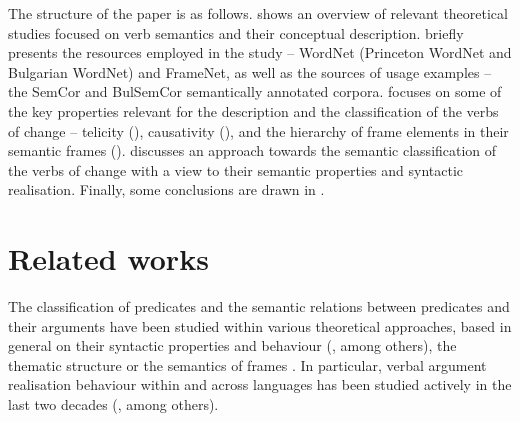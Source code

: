 \documentclass[output=paper,colorlinks,citecolor=brown]{langscibook}
\begin{document}
The structure of the paper is as follows.  shows an overview of relevant theoretical studies focused on verb semantics and their conceptual description.  briefly presents the resources employed in the study -- WordNet (Princeton WordNet and Bulgarian WordNet) and FrameNet, as well as the sources of usage examples -- the SemCor and BulSemCor semantically annotated corpora.  focuses on some of the key properties relevant for the description and the classification of the verbs of change -- telicity (), causativity (), and the hierarchy of frame elements in their semantic frames ().  discusses an approach towards the semantic classification of the verbs of change with a view to their semantic properties and syntactic realisation. Finally, some conclusions are drawn in .

\section{Related works}\label{sec:related}


The classification of predicates and the semantic relations between predicates and their arguments have been studied within various theoretical approaches, based in general on their syntactic properties and behaviour (\cite{Levin1993,Pinker1989}, among others), the thematic structure \citep{VanValinLaPolla1997} or the semantics of frames \citep{Fillmore1982}. In particular, verbal argument realisation behaviour within and across languages has been studied actively in the last two decades (\cite{RappaportHovavLevin2010,Boas2010,BeaversKoontz-Garboden2012,Levin2015,Dux2020}, among others).

\end{document}
